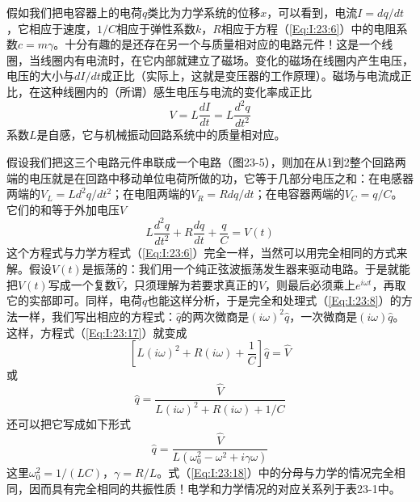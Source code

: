假如我们把电容器上的电荷$q$类比为力学系统的位移$x$，可以看到，电流$I=dq/dt$，它相应于速度，$1/C$相应于弹性系数$k$，$R$相应于方程（\ref{Eq:I:23:6}）中的电阻系数$c=m\gamma$。十分有趣的是还存在另一个与质量相对应的电路元件！这是一个线圈，当线圈内有电流时，在它内部就建立了磁场。变化的磁场在线圈内产生电压，电压的大小与$dI/dt$成正比（实际上，这就是变压器的工作原理）。磁场与电流成正比，在这种线圈内的（所谓）感生电压与电流的变化率成正比
\begin{equation}
    \label{Eq:I:23:16}
    V=L\frac{dI}{dt}=L\frac{d^2q}{dt^2}
\end{equation}
系数$L$是自感，它与机械振动回路系统中的质量相对应。

假设我们把这三个电路元件串联成一个电路（图23-5），则加在从1到2整个回路两端的电压就是在回路中移动单位电荷所做的功，它等于几部分电压之和：在电感器两端的$V_L=Ld^2q/dt^2$；在电阻两端的$V_R=Rdq/dt$；在电容器两端的$V_C=q/C$。它们的和等于外加电压$V$
\begin{equation}
    \label{Eq:I:23:17}
    L\frac{d^2q}{dt^2}+R\frac{dq}{dt}+\frac{q}{C}=V(t)
\end{equation}
这个方程式与力学方程式（\ref{Eq:I:23:6}）完全一样，当然可以用完全相同的方式来解。假设$V(t)$是振荡的：我们用一个纯正弦波振荡发生器来驱动电路。于是就能把$V(t)$写成一个复数$\hat{V}$，只须理解为若要求真正的$V$，则最后必须乘上$e^{i\omega t}$，再取它的实部即可。同样，电荷$q$也能这样分析，于是完全和处理式（\ref{Eq:I:23:8}）的方法一样，我们写出相应的方程式：$\hat{q}$的两次微商是$(i\omega)^2\hat{q}$，一次微商是$(i\omega)\hat{q}$。这样，方程式（\ref{Eq:I:23:17}）就变成
\begin{equation*}
    \left [ L(i\omega)^2+R(i\omega) +\frac{1}{C} \right ]\hat{q} = \hat{V}
\end{equation*}
或
\begin{equation*}
    \hat{q} = \frac{\hat{V}}{L(i\omega)^2+R(i\omega)+1/C}
\end{equation*}
还可以把它写成如下形式
\begin{equation}
    \label{Eq:I:23:18}
    \hat{q}=\frac{\hat{V}}{L(\omega_0^2-\omega^2+i\gamma\omega)}
\end{equation}
这里$\omega_0^2=1/(LC)$，$\gamma=R/L$。式（\ref{Eq:I:23:18}）中的分母与力学的情况完全相同，因而具有完全相同的共振性质！电学和力学情况的对应关系列于表23-1中。


